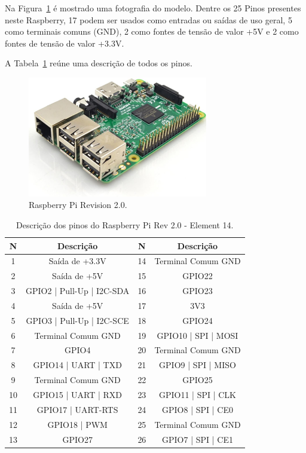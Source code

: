 \documentclass[12pt,a4paper,oneside]{book}
\begin{document}
\pagebreak

Na Figura~\ref{fig:rasp3b.jpg.0} é mostrado uma fotografia do modelo. 
Dentre os 25 Pinos presentes neste Raspberry, 17 podem ser usados como entradas ou saídas de uso geral, 5 como terminais comuns (GND), 2 como fontes de tensão de valor +5V e 2 como fontes de tensão de valor +3.3V. 

%
A Tabela~\ref{tab:Raspberry Pinout} reúne uma descrição de todos os pinos.
%
\begin{figure}[!htbp]
    \centering
    \includegraphics[width=0.7\textwidth]{Images/introducao/rasp3b.jpg}
    \caption{Raspberry Pi Revision 2.0.}
    \label{fig:rasp3b.jpg.0}
\end{figure}
%
\begin{table}[!htbp]
    \centering
    \begin{tabular}{|c|c|c|c|} 
         \hline
         \textbf{N} & \textbf{Descrição} & \textbf{N} & \textbf{Descrição} \\ [0.5ex]
         \hline
         1 & Saída de +3.3V & 14 & Terminal Comum GND\\
         \hline
         2 & Saída de +5V & 15 & GPIO22 \\
         \hline
         3 & GPIO2 | Pull-Up | I2C-SDA & 16 & GPIO23 \\ 
         \hline
         4 & Saída de +5V & 17 & 3V3 \\
         \hline
         5 & GPIO3 | Pull-Up | I2C-SCE & 18 & GPIO24 \\
         \hline
         6 & Terminal Comum GND & 19 & GPIO10 | SPI | MOSI \\ 
         \hline
         7 & GPIO4 & 20 & Terminal Comum GND \\ 
         \hline
         8 & GPIO14 | UART | TXD & 21 & GPIO9 | SPI | MISO\\
         \hline
         9 & Terminal Comum GND & 22 & GPIO25\\
         \hline
         10 & GPIO15 | UART | RXD & 23 & GPIO11 | SPI | CLK\\ 
         \hline
         11 & GPIO17 | UART-RTS & 24 & GPIO8 | SPI | CE0\\
         \hline
         12 & GPIO18 | PWM & 25 & Terminal Comum GND\\ 
         \hline
         13 & GPIO27 & 26 & GPIO7 | SPI | CE1\\ 
         \hline
    \end{tabular}
    \caption{Descrição dos pinos do Raspberry Pi Rev 2.0 - Element 14.}
    \label{tab:Raspberry Pinout}
\end{table}
\end{document}
